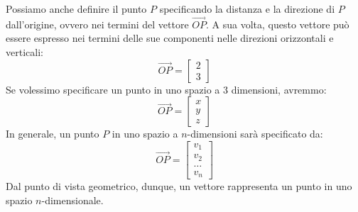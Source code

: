 Possiamo anche definire il punto $P$ specificando la distanza e la
direzione di $P$ dall'origine, ovvero nei termini del vettore
$\overrightarrow{OP}$.  
A sua volta, questo vettore pu{\`o} essere espresso nei termini
delle sue componenti nelle direzioni orizzontali e verticali:
\[
\overrightarrow{OP} = \left[ \begin{array}{c}
2\\
3
\end{array}
 \right]
\]
Se volessimo specificare un punto in uno spazio a 3 dimensioni,
avremmo:
\[
\overrightarrow{OP} = \left[ \begin{array}{c}
x\\
y\\
z
\end{array}
 \right]
\]
In generale, un punto $P$ in uno spazio a $n$-dimensioni sar{\`a}
specificato da:
\[
\overrightarrow{OP} = \left[ \begin{array}{c}
v_1\\
v_2\\
\dots\\
v_n
\end{array}
 \right]
\]
Dal punto di vista geometrico, dunque, un vettore
rappresenta un punto in uno spazio $n$-dimensionale.

% 



